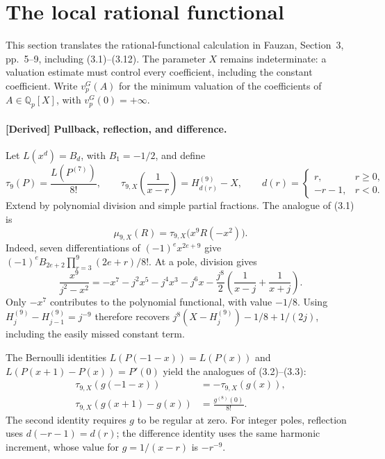 \section{The local rational functional}
\label{s3-functional}

This section translates the rational-functional calculation in Fauzan,
Section~3, pp.~5--9, including (3.1)--(3.12).  The parameter $X$ remains
indeterminate: a valuation estimate must control every coefficient, including
the constant coefficient.  Write $v_p^G(A)$ for the minimum valuation of the
coefficients of $A\in\mathbb Q_p[X]$, with $v_p^G(0)=+\infty$.

\paragraph{\textnormal{[Derived] Pullback, reflection, and difference.}}
Let $L(x^d)=B_d$, with $B_1=-1/2$, and define
\begin{equation}
 \tau_9(P)=\frac{L(P^{(7)})}{8!},\qquad
 \tau_{9,X}\!\left(\frac1{x-r}\right)=H_{d(r)}^{(9)}-X,
 \qquad
 d(r)=\begin{cases}r,&r\geq0,\\-r-1,&r<0.\end{cases}
 \label{s3-tau}
\end{equation}
Extend by polynomial division and simple partial fractions.  The analogue
of (3.1) is
\begin{equation}
 \mu_{9,X}(R)=\tau_{9,X}\bigl(x^9R(-x^2)\bigr).
 \label{s3-pullback}
\end{equation}
Indeed, seven differentiations of $(-1)^e x^{2e+9}$ give
$(-1)^e B_{2e+2}\prod_{r=3}^{9}(2e+r)/8!$.  At a pole, division gives
\[
 \frac{x^9}{j^2-x^2}
 =-x^7-j^2x^5-j^4x^3-j^6x
  -\frac{j^8}{2}\left(\frac1{x-j}+\frac1{x+j}\right).
\]
Only $-x^7$ contributes to the polynomial functional, with value $-1/8$.
Using $H_j^{(9)}-H_{j-1}^{(9)}=j^{-9}$ therefore recovers
$j^8(X-H_j^{(9)})-1/8+1/(2j)$, including the easily missed constant term.

The Bernoulli identities $L(P(-1-x))=L(P(x))$ and
$L(P(x+1)-P(x))=P'(0)$ yield the analogues of (3.2)--(3.3):
\begin{align}
 \tau_{9,X}(g(-1-x))&=-\tau_{9,X}(g(x)),
 \label{s3-reflection}\\
 \tau_{9,X}(g(x+1)-g(x))&=\frac{g^{(8)}(0)}{8!}.
 \label{s3-difference}
\end{align}
The second identity requires $g$ to be regular at zero.  For integer poles,
reflection uses $d(-r-1)=d(r)$; the difference identity uses the same
harmonic increment, whose value for $g=1/(x-r)$ is $-r^{-9}$.

